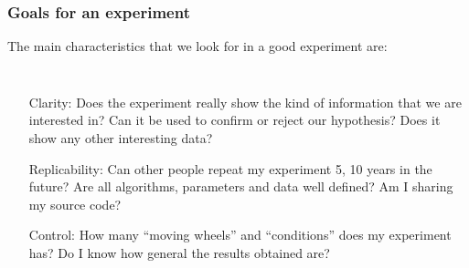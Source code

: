 \documentclass{beamer}
\begin{document}
\begin{frame}
  \frametitle{Goals for an experiment}
  
  The main characteristics that we look for in a good experiment are:
  \bigskip 

  \begin{columns}[c]
    {\small
      \begin{enumerate}
      \item [Clarity:] Does the experiment really show the kind of
        information that we are interested in? Can it be used to confirm
        or reject our hypothesis? Does it show any other interesting data?
      \item [Replicability:] Can other people repeat my experiment 5, 10
        years in the future? Are all algorithms, parameters and data well
        defined? Am I sharing my source code?
      \item [Control:] How many ``moving wheels'' and ``conditions'' does
        my experiment has? Do I know how general the results obtained are?
    \end{enumerate}}
  \end{columns}
\end{frame}
\end{document}
